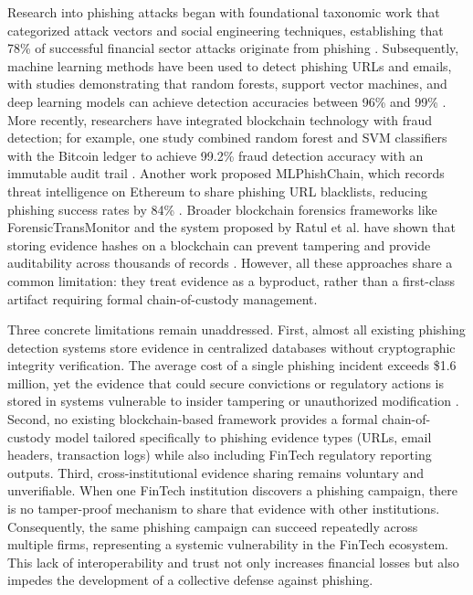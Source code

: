 \documentclass[conference]{IEEEtran}
\begin{document}
Research into phishing attacks began with foundational taxonomic work that categorized attack vectors and social engineering techniques, establishing that 78\% of successful financial sector attacks originate from phishing \cite{alkhalil2021}. Subsequently, machine learning methods have been used to detect phishing URLs and emails, with studies demonstrating that random forests, support vector machines, and deep learning models can achieve detection accuracies between 96\% and 99\% \cite{alnemari2023}. More recently, researchers have integrated blockchain technology with fraud detection; for example, one study combined random forest and SVM classifiers with the Bitcoin ledger to achieve 99.2\% fraud detection accuracy with an immutable audit trail \cite{aslam2022}. Another work proposed MLPhishChain, which records threat intelligence on Ethereum to share phishing URL blacklists, reducing phishing success rates by 84\% \cite{trad2024}. Broader blockchain forensics frameworks like ForensicTransMonitor and the system proposed by Ratul et al. have shown that storing evidence hashes on a blockchain can prevent tampering and provide auditability across thousands of records \cite{ratul2024, alkhateeb2024}. However, all these approaches share a common limitation: they treat evidence as a byproduct, rather than a first-class artifact requiring formal chain-of-custody management.

Three concrete limitations remain unaddressed. First, almost all existing phishing detection systems store evidence in centralized databases without cryptographic integrity verification. The average cost of a single phishing incident exceeds \$1.6 million, yet the evidence that could secure convictions or regulatory actions is stored in systems vulnerable to insider tampering or unauthorized modification \cite{tamal2024}. Second, no existing blockchain-based framework provides a formal chain-of-custody model tailored specifically to phishing evidence types (URLs, email headers, transaction logs) while also including FinTech regulatory reporting outputs. Third, cross-institutional evidence sharing remains voluntary and unverifiable. When one FinTech institution discovers a phishing campaign, there is no tamper-proof mechanism to share that evidence with other institutions. Consequently, the same phishing campaign can succeed repeatedly across multiple firms, representing a systemic vulnerability in the FinTech ecosystem. This lack of interoperability and trust not only increases financial losses but also impedes the development of a collective defense against phishing.
\end{document}
